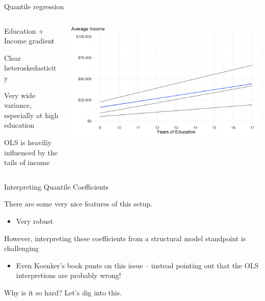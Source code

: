 \documentclass[notes,11pt, aspectratio=169]{beamer}
\newenvironment{wideitemize}{\itemize\addtolength{\itemsep}{10pt}}{\enditemize}
\begin{document}
\begin{frame}{Quantile regression}
  \begin{columns}[T] %
    \begin{column}{.3\textwidth}
  \begin{wideitemize}
    \item Education + Income  gradient
    \item Clear heteroskedasticity
    \item Very wide variance, especially at high education
    \item OLS is heaviliy influenced by the tails of income      
  \end{wideitemize}
  \end{column}%
  \hfill%
  \begin{column}{.7\textwidth}
    \includegraphics[width=\linewidth]{avg_income_education_scatter_ols_quantile_zoom.png}
  \end{column}
\end{columns}
\end{frame}


\begin{frame}{Interpreting Quantile Coefficients}
  \begin{wideitemize}
  \item   There are some very nice features of this setup.
    \begin{itemize}
    \item Very robust
    \end{itemize}
  \item However, interpreting these coefficients from a structural
    model standpoint is challenging
    \begin{itemize}
    \item Even Koenker's book punts on this issue -- instead pointing
      out that the OLS interpretions are probably wrong!
    \end{itemize}
  \item Why is it so hard? Let's dig into this.
  \end{wideitemize}
\end{frame}
\end{document}
